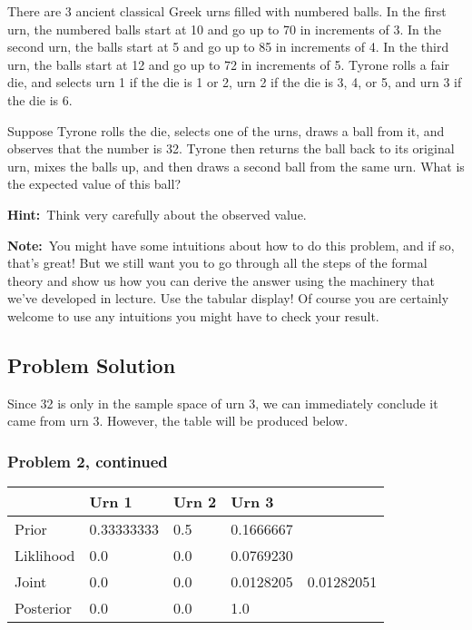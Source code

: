 \documentclass[12pt]{article}
\theoremstyle{definition}
\begin{document}
There are 3 ancient classical Greek urns filled with numbered balls. In the first urn, the numbered balls start at 10 and go up to 70 in increments of 3. In the second urn, the balls start at 5 and go up to 85 in increments of 4. In the third urn, the balls start at 12 and go up to 72 in increments of 5. Tyrone rolls a fair die, and selects urn 1 if the die is 1 or 2, urn 2 if the die is 3, 4, or 5, and urn 3 if the die is 6.

\bigskip
\noindent
Suppose Tyrone rolls the die, selects one of the urns, draws a ball from it, and observes that the number is 32. Tyrone then returns the ball back to its original urn, mixes the balls up, and then draws a second ball from the same urn. What is the expected value of this ball?

\bigskip
\noindent
{\bf Hint:}\ Think very carefully about the observed value.

\bigskip
\noindent
{\bf Note:}\ You might have some intuitions about how to do this problem, and if so, that's great! But we still want you to go through all the steps of the formal theory and show us how you can derive the answer using the machinery that we've developed in lecture. Use the tabular display! Of course you are certainly welcome to use any intuitions you might have to check your result.



\subsection*{Problem Solution}

Since 32 is only in the sample space of urn 3, we can immediately conclude it came from urn 3. However, the table will be produced below.\\

\newpage
\subsubsection*{Problem 2, continued}
\begin{tabular}{lllll}
          & Urn 1      & Urn 2     & Urn 3     &           \\
\hline
Prior     & 0.33333333 & 0.5       & 0.1666667 &           \\
Liklihood & 0.0        & 0.0       & 0.0769230 &           \\
Joint     & 0.0        & 0.0       & 0.0128205 & 0.01282051\\
Posterior & 0.0        & 0.0       & 1.0      &           \\
\hline
\end{tabular}
\end{document}
